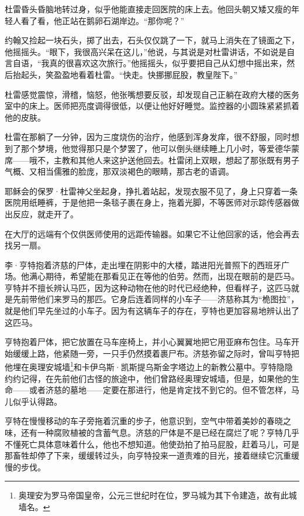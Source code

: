 \documentclass[AutoFakeBold=true]{book}
\begin{document}
杜雷昏头昏脑地转过身，似乎他能直接走回医院的床上去。他回头朝又矮又瘦的年轻人看了看，他正站在鹅卵石湖岸边。``那你呢？''

约翰又捡起一块石头，掷了出去，石头仅仅跳了一下，就马上消失在了镜面之下，他摇摇头。``眼下，我很高兴呆在这儿，''他说，与其说是对杜雷讲话，不如说是自言自语，``我真的很喜欢这次旅行。''他摇摇头，似乎要把自己从幻想中摇出来，然后抬起头，笑盈盈地看着杜雷。``快走。快挪挪屁股，教皇陛下。''

杜雷感觉震惊，滑稽，恼怒，他张嘴想要反驳，却发现自己正躺在政府大楼的医务室中的床上。医师把亮度调得很低，以便让他好好睡觉。监控器的小圆珠紧紧抓着他的皮肤。

杜雷在那躺了一分钟，因为三度烧伤的治疗，他感到浑身发痒，很不舒服，同时想到了那个梦境，他觉得那只是个梦罢了，他可以倒头继续睡上几小时，等爱德华蒙席——哦不，主教和其他人来这护送他回去。杜雷闭上双眼，想起了那张既有男子气概、又相当儒雅的脸庞，那双淡褐色的眼睛，那古老的语调。

耶稣会的保罗·杜雷神父坐起身，挣扎着站起，发现衣服不见了，身上只穿着一条医院用纸睡裤，于是他把一条毯子裹在身上，拖着光脚，不等医师对示踪传感器做出反应，就走开了。

在大厅的远端有个仅供医师使用的远距传输器。如果它不让他回家的话，他会再去找另一扇。

\vspace*{1em}

李·亨特抱着济慈的尸体，走出埋在阴影中的大楼，踏进阳光普照下的西班牙广场。他满心期待，希望能在那看见正在等他的伯劳。然而，出现在眼前的是匹马。亨特并不擅长辨认马匹，因为这种动物在他的时代已经绝种，但看样子，这匹马就是先前带他们来罗马的那匹。它身后连着同样的小车子——济慈称其为``桅图拉''，就是他们早先坐过的小车子。因为有这辆车子的存在，亨特也更加容易地辨认出了这匹马。

亨特抱着尸体，把它放置在马车座椅上，并小心翼翼地把它用亚麻布包住。马车开始缓缓上路，他紧随一旁，一只手仍然摸着裹尸布。济慈弥留之际时，曾叫亨特把他埋在奥理安城墙\footnote{奥理安为罗马帝国皇帝，公元三世纪时在位，罗马城为其下令建造，故有此城墙名。}和卡伊乌斯·凯斯提乌斯金字塔边上的新教公墓中。亨特隐隐约约记得，在先前他们古怪的旅途中，他们曾路经奥理安城墙，但是，如果他的生命——或者济慈的墓地——定要在那进行，他是肯定找不到它的。但不管怎样，马儿似乎认得路。

亨特在慢慢移动的车子旁拖着沉重的步子，他意识到，空气中带着美妙的春晓之味，还有一种腐败植被的含蓄气息。济慈的尸体是不是已经在腐烂了呢？亨特几乎不懂死亡具体意味着什么，他也不想知道。他使劲拍了拍马屁股，赶着马儿，可是那畜牲却停了下来，缓缓转过头，向亨特投来一道责难的目光，接着继续它沉重缓慢的步伐。
\end{document}
